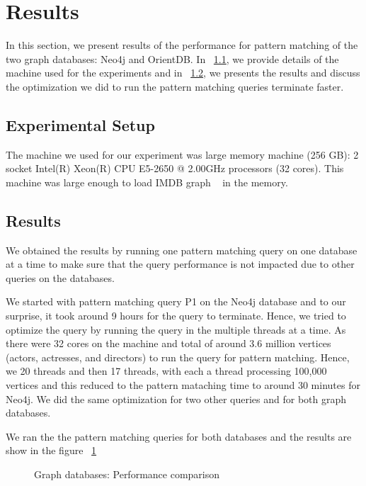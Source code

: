 
\section{Results}
In this section, we present results of the performance for pattern matching of the two graph databases: Neo4j and OrientDB. In ~\ref{setup}, we provide details of the machine used for the experiments and in ~\ref{result}, we presents the results and discuss the optimization we did to run the pattern matching queries terminate faster.

\subsection{Experimental Setup}
\label{setup}

The machine we used for our experiment was large memory machine (256 GB): 2 socket Intel(R) Xeon(R) CPU E5-2650 @ 2.00GHz processors (32 cores). This machine was large enough to load IMDB graph ~\cite{IMDb96:online} in the memory.

\subsection{Results}
\label{result}
We obtained the results by running one pattern matching query on one database at a time to make sure that the query performance is not impacted due to other queries on the databases.

We started with pattern matching query P1 on the Neo4j database and to our surprise, it took around 9 hours for the query to terminate. Hence, we tried to optimize the query by running the query in the multiple threads at a time. As there were 32 cores on the machine and total of around 3.6 million vertices (actors, actresses, and directors) to run the query for pattern matching. Hence, we 20 threads and then 17 threads, with each a thread processing 100,000 vertices and this reduced to the pattern mataching time to around 30 minutes for Neo4j. We did the same optimization for two other queries and for both graph databases.

We ran the the pattern matching queries for both databases and the results are show in the figure ~\ref{fig:comparsion}

\begin{figure}[h!]
	\centering
	\caption{Graph databases: Performance comparison}
	\label{fig:comparsion}
	\centering
\end{figure}

